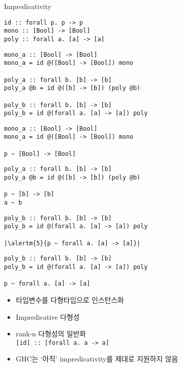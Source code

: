 \documentclass{beamer}
\newcommand\alertm[2]{\alert<#1>{#2}}
\begin{document}
\begin{frame}[fragile] {Impredicativity}
\begin{verbatim}
id :: forall p. p -> p
mono :: [Bool] -> [Bool]
poly :: forall a. [a] -> [a]
\end{verbatim}
  \text{\newline}
  \begin{overprint}
\begin{verbatim}
mono_a :: [Bool] -> [Bool]
mono_a = id @([Bool] -> [Bool]) mono

poly_a :: forall b. [b] -> [b]
poly_a @b = id @([b] -> [b]) (poly @b)

poly_b :: forall b. [b] -> [b]
poly_b = id @(forall a. [a] -> [a]) poly
\end{verbatim}
\begin{verbatim}
mono_a :: [Bool] -> [Bool]
mono_a = id @([Bool] -> [Bool]) mono

p ~ [Bool] -> [Bool]
\end{verbatim}
\begin{verbatim}
poly_a :: forall b. [b] -> [b]
poly_a @b = id @([b] -> [b]) (poly @b)

p ~ [b] -> [b]
a ~ b
\end{verbatim}
\begin{verbatim}
poly_b :: forall b. [b] -> [b]
poly_b = id @(forall a. [a] -> [a]) poly

|\alertm{5}{p ~ forall a. [a] -> [a]}|
\end{verbatim}
     {
    }
\begin{verbatim}
poly_b :: forall b. [b] -> [b]
poly_b = id @(forall a. [a] -> [a]) poly

p ~ forall a. [a] -> [a]
\end{verbatim}
    \begin{itemize}
      \item 타입변수를 다형타입으로 인스턴스화
      \item Impredicative 다형성
      \item rank-n 다형성의 일반화\\
        \texttt{[id] :: [forall a. a -> a]}
      \item GHC는 `아직' impredicativity를 제대로 지원하지 않음
    \end{itemize}
  \end{overprint}
\end{frame}
\end{document}
